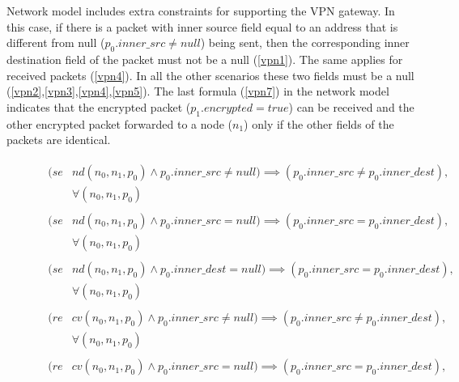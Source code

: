 Network model includes extra constraints for supporting the VPN gateway. In this case, if there is a packet with inner source field equal to an address that is different from null ($p_{0}.inner\_src \neq null$) being sent, then the corresponding inner destination field of the packet must not be a null (\ref{vpn1}). The same applies for received packets (\ref{vpn4}). In all the other scenarios these two fields must be a null (\ref{vpn2},\ref{vpn3},\ref{vpn4},\ref{vpn5}). The last formula (\ref{vpn7}) in the network model indicates that the encrypted packet ($p_{1}.encrypted = true$) can be received and the other encrypted packet forwarded to a node ($n_{1}$) only if the other fields of the packets are identical.

\begin{figure}[h]
	{\footnotesize
		\begin{subequations}
			\begin{align}
				\begin{split}
					\label{vpn1}
					(se& nd(n_{0},  n_{1}, p_{0}) \wedge p_{0}.inner\_src \neq null ) \implies  (p_{0}.inner\_src \neq p_{0}.inner\_dest ), \\
					& \forall (n_{0},n_{1}, p_{0})
				\end{split} \\							
				\begin{split}
					\label{vpn2}
					(se& nd(n_{0},  n_{1}, p_{0}) \wedge p_{0}.inner\_src = null ) \implies  (p_{0}.inner\_src = p_{0}.inner\_dest ), \\
					& \forall (n_{0},n_{1}, p_{0})
				\end{split}\\	
				\begin{split}
					\label{vpn3}
					(se& nd(n_{0},  n_{1}, p_{0}) \wedge p_{0}.inner\_dest = null ) \implies  (p_{0}.inner\_src = p_{0}.inner\_dest), \\
					& \forall (n_{0},n_{1}, p_{0})
				\end{split} \\
				\begin{split}
					\label{vpn4}
					(re& cv(n_{0},  n_{1}, p_{0}) \wedge p_{0}.inner\_src \neq null ) \implies  (p_{0}.inner\_src \neq p_{0}.inner\_dest), \\
					& \forall (n_{0},n_{1}, p_{0})
				\end{split} \\
				\begin{split}
					\label{vpn5}
					(re& cv(n_{0},  n_{1}, p_{0}) \wedge p_{0}.inner\_src = null ) \implies  (p_{0}.inner\_src = p_{0}.inner\_dest), \\

\end{split}
\end{align}
\end{subequations}}
\end{figure}
